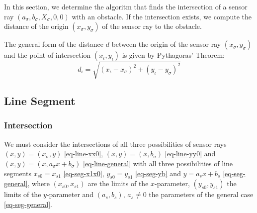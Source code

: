 \documentclass[11pt]{article}
\newcommand{\asig}{a_\sigma}
\newcommand{\bsig}{b_\sigma}
\newcommand{\diota}{d_\iota}
\newcommand{\xiota}{x_\iota}
\newcommand{\xsig}{x_\sigma}
\newcommand{\Xsig}{X_\sigma}
\newcommand{\yiota}{y_\iota}
\newcommand{\ysig}{y_\sigma}
\begin{document}
In this section, we determine the algoritm that finds the intersection of a
sensor ray $(\asig, \bsig, \Xsig, 0, 0)$ with an obstacle. If the intersection
exists, we compute the distance of the origin $(\xsig, \ysig)$ of the sensor
ray to the obstacle.

The general form of the distance $d$ between the origin of the sensor ray
$(\xsig,\ysig)$ and the point of intersection $(\xiota,\yiota)$ is given by 
Pythagoras' Theorem:
\begin{equation}
    \diota = \sqrt{(\xiota-\xsig)^2 + (\yiota-\ysig)^2}
\end{equation}

\subsection{Line Segment}
\label{sec-intersection-line-segment}

\subsubsection*{Intersection}

We must consider the intersections of all three possibilities of sensor rays
$(x, y) =(\xsig, y)$ \eqref{eq-line-xx0}, $(x, y)=(x, \bsig)$ 
\eqref{eq-line-yy0} and $(x, y) = (x, \asig x+\bsig)$
\eqref{eq-line-general} with all three possibilities of line segments
$x_{s0}=x_{s1}$ \eqref{eq-seg-x1x0}, $y_{s0}=y_{s1}$ \eqref{eq-seg-yb} and
$y=a_{s}x+b_{s}$ \eqref{eq-seg-general}, where $(x_{s0}, x_{s1})$ are the
limits of the $x$-parameter, $(y_{s0}, y_{s1})$ the limits of the
$y$-parameter and $(a_{s}, b_{s}),\,a_{s}\neq 0$ the parameters of the 
general case
\eqref{eq-seg-general}.
\end{document}
